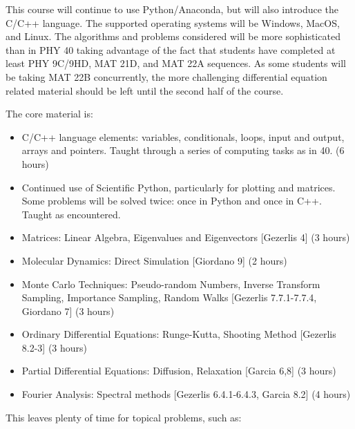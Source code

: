 \documentclass[12pt]{article}
\begin{document}
This course will continue to use Python/Anaconda, but will also
introduce the C/C++ language.  The supported operating systems will be
Windows, MacOS, and Linux.  The algorithms and problems considered
will be more sophisticated than in PHY 40 taking advantage of the fact
that students have completed at least PHY 9C/9HD, MAT 21D, and MAT 22A
sequences.  As some students will be taking MAT 22B concurrently, the
more challenging differential equation related material should be left
until the second half of the course.

The core material is:
\begin{itemize}
\item C/C++ language elements: variables, conditionals, loops, input
  and output, arrays and pointers.  Taught through a series of
  computing tasks as in 40. (6 hours)
\item Continued use of Scientific Python, particularly for plotting
  and matrices.  Some problems will be solved twice: once in Python
  and once in C++.  Taught as encountered.
\item Matrices: Linear Algebra, Eigenvalues and Eigenvectors [Gezerlis 4] (3 hours)
\item Molecular Dynamics:  Direct Simulation [Giordano 9] (2 hours)
\item Monte Carlo Techniques: Pseudo-random Numbers, Inverse Transform Sampling, Importance Sampling, Random Walks [Gezerlis 7.7.1-7.7.4, Giordano 7] (3 hours)
\item Ordinary Differential Equations:  Runge-Kutta, Shooting Method [Gezerlis 8.2-3] (3 hours)
\item Partial  Differential Equations:  Diffusion, Relaxation  [Garcia 6,8] (3 hours)
\item Fourier Analysis:  Spectral methods [Gezerlis 6.4.1-6.4.3, Garcia 8.2] (4 hours)
\end{itemize}
This leaves plenty of time for topical problems, such as:
\end{document}
